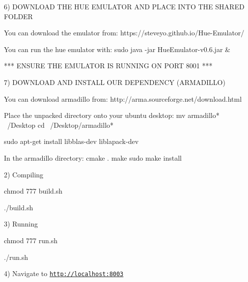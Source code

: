 \begin{DoxyVerb}
    6) DOWNLOAD THE HUE EMULATOR AND PLACE INTO THE SHARED FOLDER

        You can download the emulator from:
            https://steveyo.github.io/Hue-Emulator/

        You can run the hue emulator with:
            sudo java -jar HueEmulator-v0.6.jar &

        *** ENSURE THE EMULATOR IS RUNNING ON PORT 8001 ***

    7) DOWNLOAD AND INSTALL OUR DEPENDENCY (ARMADILLO)

        You can download armadillo from:
            http://arma.sourceforge.net/download.html

        Place the unpacked directory onto your ubuntu desktop:
            mv armadillo* ~/Desktop
            cd ~/Desktop/armadillo*

        sudo apt-get install libblas-dev liblapack-dev

        In the armadillo directory:
            cmake .
            make
            sudo make install
\end{DoxyVerb}


2) Compiling \begin{DoxyVerb}chmod 777 build.sh

./build.sh
\end{DoxyVerb}


3) Running \begin{DoxyVerb}chmod 777 run.sh

./run.sh
\end{DoxyVerb}


4) Navigate to \href{http://localhost:8003}{\tt http\+://localhost\+:8003} 